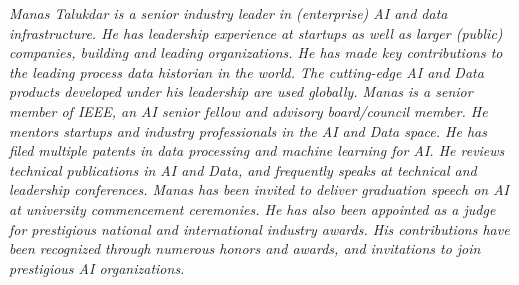 {\selectfont
	\begin{justify}\textit{Manas Talukdar is a senior industry leader in (enterprise) AI and data infrastructure. He has leadership experience at startups as well as larger (public) companies, building and leading organizations. He has made key contributions to the leading process data historian in the world. The cutting-edge AI and Data products developed under his leadership are used globally. Manas is a senior member of IEEE, an AI senior fellow and advisory board/council member. He mentors startups and industry professionals in the AI and Data space. He has filed multiple patents in data processing and machine learning for AI. He reviews technical publications in AI and Data, and frequently speaks at technical and leadership conferences. Manas has been invited to deliver graduation speech on AI at university commencement ceremonies. He has also been appointed as a judge for prestigious national and international industry awards. His contributions have been recognized through numerous honors and awards, and invitations to join prestigious AI organizations.}\end{justify}
}
\vspace{-12pt}